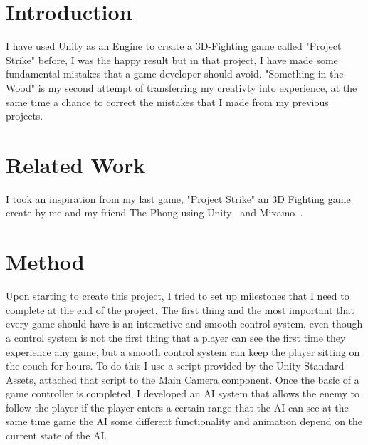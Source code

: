 \documentclass[sigconf]{acmart}
\begin{document}
\maketitle

\section{Introduction}

I have used Unity as an Engine to create a 3D-Fighting game called "Project Strike" before, I was the happy result but in that project, I have made some fundamental mistakes that a game developer should avoid. "Something in the Wood" is my second attempt of transferring my creativty into experience, at the same time a chance to correct the mistakes that I made from my previous projects.

\section{Related Work}

I took an inspiration from my last game, "Project Strike" an 3D Fighting game create by me and my friend The Phong using Unity~\cite{XTK} and Mixamo~\cite{Threejs}.

\section{Method}

Upon starting to create this project, I tried to set up milestones that I need to complete at the end of the project. The first thing and the most important that every game should have is an interactive and smooth control system, even though a control system is not the first thing that a player can see the first time they experience any game, but a smooth control system can keep the player sitting on the couch for hours. To do this I use a script provided by the Unity Standard Assets, attached that script to the Main Camera component. Once the basic of a game controller is completed, I developed an AI system that allows the enemy to follow the player if the player enters a certain range that the AI can see at the same time game the AI some different functionality and animation depend on the current state of the AI.
\end{document}
